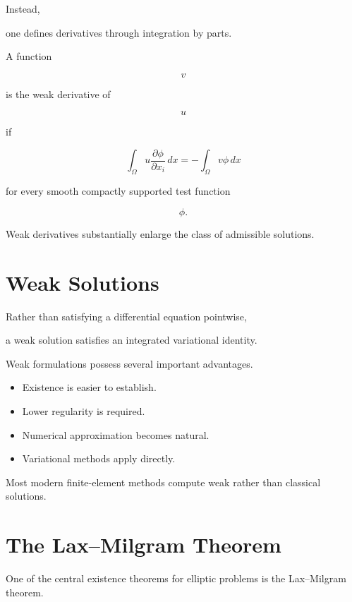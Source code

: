 \documentclass[11pt,fleqn]{book}
\numberwithin{equation}{chapter}
\theoremstyle{plain}
\theoremstyle{definition}
\theoremstyle{remark}
\begin{document}
Instead,

one defines derivatives through integration by parts.

A function

\[
v
\]

is the weak derivative of

\[
u
\]

if

\[
\boxed{
\int_\Omega
u
\frac{\partial\phi}{\partial x_i}
\,dx
=
-
\int_\Omega
v
\phi
\,dx
}
\]

for every smooth compactly supported test function

\[
\phi.
\]

Weak derivatives substantially enlarge the class of admissible
solutions.


\section{Weak Solutions}

Rather than satisfying a differential equation pointwise,

a weak solution satisfies an integrated variational identity.

Weak formulations possess several important advantages.

\begin{itemize}
\item Existence is easier to establish.
\item Lower regularity is required.
\item Numerical approximation becomes natural.
\item Variational methods apply directly.
\end{itemize}

Most modern finite-element methods compute weak rather than classical
solutions.


\section{The Lax--Milgram Theorem}

One of the central existence theorems for elliptic problems is the
Lax--Milgram theorem.
\end{document}
